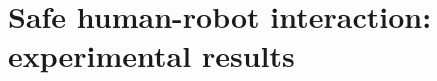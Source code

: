 \chapter{Safe human-robot interaction: experimental results}
\label{chap:safety2}
\begin{synopsis}

\end{synopsis}
